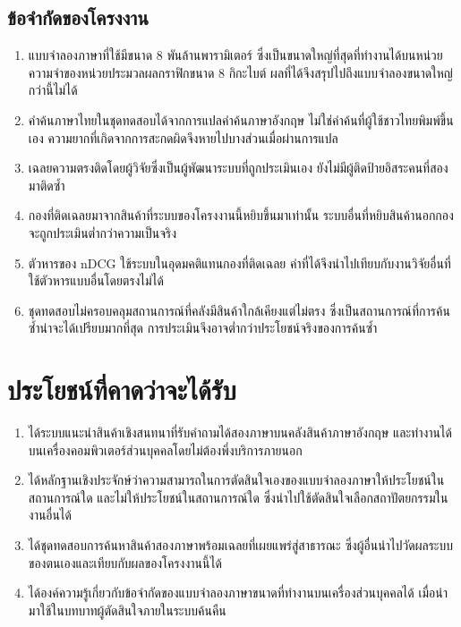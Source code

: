 \subsection{ข้อจำกัดของโครงงาน}

\begin{enumerate}[label=\arabic*)]
    \item แบบจำลองภาษาที่ใช้มีขนาด 8 พันล้านพารามิเตอร์ ซึ่งเป็นขนาดใหญ่ที่สุดที่ทำงานได้บนหน่วยความจำของหน่วยประมวลผลกราฟิกขนาด 8 กิกะไบต์ ผลที่ได้จึงสรุปไปถึงแบบจำลองขนาดใหญ่กว่านี้ไม่ได้
    \item คำค้นภาษาไทยในชุดทดสอบได้จากการแปลคำค้นภาษาอังกฤษ ไม่ใช่คำค้นที่ผู้ใช้ชาวไทยพิมพ์ขึ้นเอง ความยากที่เกิดจากการสะกดผิดจึงหายไปบางส่วนเมื่อผ่านการแปล
    \item เฉลยความตรงติดโดยผู้วิจัยซึ่งเป็นผู้พัฒนาระบบที่ถูกประเมินเอง ยังไม่มีผู้ติดป้ายอิสระคนที่สองมาติดซ้ำ
    \item กองที่ติดเฉลยมาจากสินค้าที่ระบบของโครงงานนี้หยิบขึ้นมาเท่านั้น ระบบอื่นที่หยิบสินค้านอกกองจะถูกประเมินต่ำกว่าความเป็นจริง \cite{zobel1998reliable}
    \item ตัวหารของ nDCG ใช้ระบบในอุดมคติแทนกองที่ติดเฉลย ค่าที่ได้จึงนำไปเทียบกับงานวิจัยอื่นที่ใช้ตัวหารแบบอื่นโดยตรงไม่ได้
    \item ชุดทดสอบไม่ครอบคลุมสถานการณ์ที่คลังมีสินค้าใกล้เคียงแต่ไม่ตรง ซึ่งเป็นสถานการณ์ที่การค้นซ้ำน่าจะได้เปรียบมากที่สุด การประเมินจึงอาจต่ำกว่าประโยชน์จริงของการค้นซ้ำ
\end{enumerate}

\section{ประโยชน์ที่คาดว่าจะได้รับ}

\begin{enumerate}[label=\arabic*)]
    \item ได้ระบบแนะนำสินค้าเชิงสนทนาที่รับคำถามได้สองภาษาบนคลังสินค้าภาษาอังกฤษ และทำงานได้บนเครื่องคอมพิวเตอร์ส่วนบุคคลโดยไม่ต้องพึ่งบริการภายนอก
    \item ได้หลักฐานเชิงประจักษ์ว่าความสามารถในการตัดสินใจเองของแบบจำลองภาษาให้ประโยชน์ในสถานการณ์ใด และไม่ให้ประโยชน์ในสถานการณ์ใด ซึ่งนำไปใช้ตัดสินใจเลือกสถาปัตยกรรมในงานอื่นได้
    \item ได้ชุดทดสอบการค้นหาสินค้าสองภาษาพร้อมเฉลยที่เผยแพร่สู่สาธารณะ ซึ่งผู้อื่นนำไปวัดผลระบบของตนเองและเทียบกับผลของโครงงานนี้ได้
    \item ได้องค์ความรู้เกี่ยวกับข้อจำกัดของแบบจำลองภาษาขนาดที่ทำงานบนเครื่องส่วนบุคคลได้ เมื่อนำมาใช้ในบทบาทผู้ตัดสินใจภายในระบบค้นคืน
\end{enumerate}
